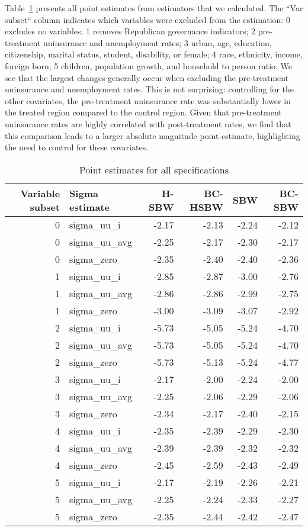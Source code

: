 Table~\ref{tab:ptests} presents all point estimates from estimators that we calculated. The ``Var subset`` column indicates which variables were excluded from the estimation: 0 excludes no variables; 1 removes Republican governance indicators; 2 pre-treatment uninsurance and unemployment rates; 3 urban, age, education, citizenship, marital status, student, disability, or female; 4 race, ethnicity, income, foreign born; 5 children, population growth, and household to person ratio. We see that the largest changes generally occur when excluding the pre-treatment uninsurance and unemployment rates. This is not surprising: controlling for the other covariates, the pre-treatment uninsurance rate was substantially lower in the treated region compared to the control region. Given that pre-treatment uninsurance rates are highly correlated with post-treatment rates, we find that this comparison leads to a larger absolute magnitude point estimate, highlighting the need to control for these covariates.

\begin{table}[ht]
\centering
\caption{Point estimates for all specifications}
\label{tab:ptests}
\begin{tabular}{rlrrrr}
  \hline
Variable subset & Sigma estimate & H-SBW & BC-HSBW & SBW & BC-SBW \\ 
  \hline
0 & sigma\_uu\_i & -2.17 & -2.13 & -2.24 & -2.12 \\ 
  0 & sigma\_uu\_avg & -2.25 & -2.17 & -2.30 & -2.17 \\ 
  0 & sigma\_zero & -2.35 & -2.40 & -2.40 & -2.36 \\ 
  1 & sigma\_uu\_i & -2.85 & -2.87 & -3.00 & -2.76 \\ 
  1 & sigma\_uu\_avg & -2.86 & -2.86 & -2.99 & -2.75 \\ 
  1 & sigma\_zero & -3.00 & -3.09 & -3.07 & -2.92 \\ 
  2 & sigma\_uu\_i & -5.73 & -5.05 & -5.24 & -4.70 \\ 
  2 & sigma\_uu\_avg & -5.73 & -5.05 & -5.24 & -4.70 \\ 
  2 & sigma\_zero & -5.73 & -5.13 & -5.24 & -4.77 \\ 
  3 & sigma\_uu\_i & -2.17 & -2.00 & -2.24 & -2.00 \\ 
  3 & sigma\_uu\_avg & -2.25 & -2.06 & -2.29 & -2.06 \\ 
  3 & sigma\_zero & -2.34 & -2.17 & -2.40 & -2.15 \\ 
  4 & sigma\_uu\_i & -2.35 & -2.39 & -2.29 & -2.30 \\ 
  4 & sigma\_uu\_avg & -2.39 & -2.39 & -2.32 & -2.32 \\ 
  4 & sigma\_zero & -2.45 & -2.59 & -2.43 & -2.49 \\ 
  5 & sigma\_uu\_i & -2.17 & -2.19 & -2.26 & -2.21 \\ 
  5 & sigma\_uu\_avg & -2.25 & -2.24 & -2.33 & -2.27 \\ 
  5 & sigma\_zero & -2.35 & -2.44 & -2.42 & -2.47 \\ 
   \hline
\end{tabular}
\end{table}

